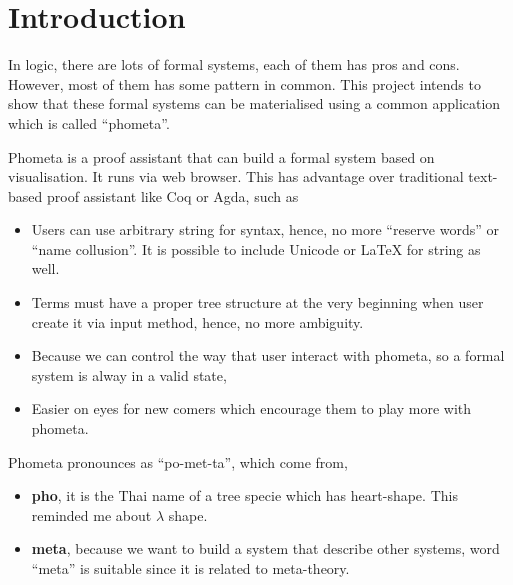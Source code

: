 

\chapter{Introduction}

In logic, there are lots of formal systems, each of them has pros and cons. However, most of them has some pattern in common. This project intends to show that these formal systems can be materialised using a common application which is called ``phometa''.

Phometa is a proof assistant that can build a formal system based on visualisation. It runs via web browser. This has advantage over traditional text-based proof assistant like Coq or Agda, such as

\begin{itemize}
    \item Users can use arbitrary string for syntax, hence, no more ``reserve words'' or ``name collusion''. It is possible to include Unicode or LaTeX for string as well.
    \item Terms must have a proper tree structure at the very beginning when user create it via input method, hence, no more ambiguity.
    \item Because we can control the way that user interact with phometa, so a formal system is alway in a valid state,
    \item Easier on eyes for new comers which encourage them to play more with phometa.
\end{itemize}

Phometa pronounces as ``po-met-ta'', which come from,

\begin{itemize}
    \item \textbf{pho}, it is the Thai name of a tree specie which has heart-shape. This reminded me about $\lambda$ shape.
    \item \textbf{meta}, because we want to build a system that describe other systems, word ``meta'' is suitable since it is related to meta-theory.
\end{itemize}